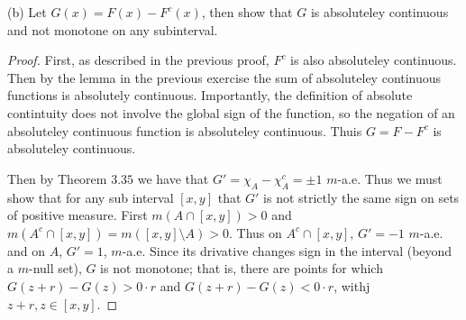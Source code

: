 \documentclass[11pt]{amsart}
\theoremstyle{definition}
\numberwithin{theorem}{section}
\numberwithin{definition}{section}
\numberwithin{equation}{section}
\begin{document}
(b) Let $G(x) = F(x) - F^c(x)$, then show that $G$ is absoluteley continuous and not monotone on any subinterval.
\begin{proof}
	First, as described in the previous proof, $F^c$ is also absoluteley continuous. Then by the lemma in the previous exercise the sum of
	absoluteley continuous functions is absolutely continuous. Importantly, the definition of absolute contintuity does not involve the global sign of the function, so the negation of an absoluteley continuous function is absoluteley continuous. Thuis $G = F - F^c$ is absoluteley continuous.

	Then by Theorem $3.35$ we have that $G' = \chi_A - \chi_A^c = \pm 1$ $m$-a.e. Thus we must show that for any sub interval $[x,y]$
	that $G'$ is not strictly the same sign on sets of positive measure. First
	$m(A \cap [x,y]) > 0$ and $m(A^c \cap [x,y]) = m([x,y] \setminus A) > 0$. Thus on $A^c \cap [x,y]$, $G' = -1$ $m$-a.e. and on $A$, $G' = 1$, $m$-a.e. Since its drivative changes sign in the interval (beyond a $m$-null set), $G$ is not monotone; that is, there are points for which $G(z+r) - G(z) > 0\cdot r$ and $G(z+r) - G(z) < 0 \cdot r$, withj $z+r, z \in [x,y].$

\end{proof}
\end{document}
